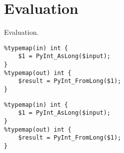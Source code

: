 
\section{Evaluation}

Evaluation. 

\begin{verbatim}
%typemap(in) int {
    $1 = PyInt_AsLong($input);
}
%typemap(out) int {
    $result = PyInt_FromLong($1);
}
\end{verbatim}

\begin{verbatim}
%typemap(in) int {
    $1 = PyInt_AsLong($input);
}
%typemap(out) int {
    $result = PyInt_FromLong($1);
}
\end{verbatim}

